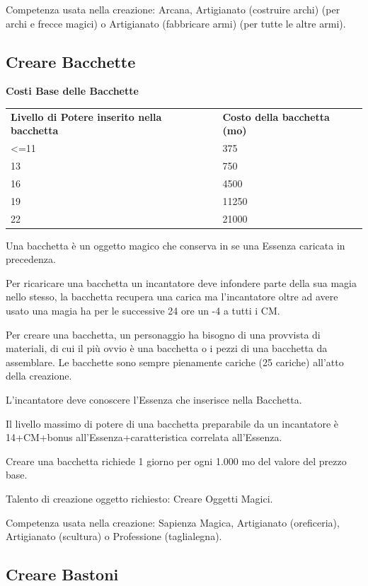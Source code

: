 \documentclass[a4paper,11pt,twoside,openany]{book}
\begin{document}
Competenza usata nella creazione: Arcana, Artigianato (costruire archi) (per archi e frecce magici) o Artigianato (fabbricare armi) (per tutte le altre armi).

\subsection{Creare Bacchette}

\bigskip

\textbf{Costi Base delle Bacchette}

\begin{tabular}{ll}
	\toprule
	\textbf{Livello di Potere inserito nella bacchetta} & \textbf{Costo della bacchetta (mo)}\\
	\textless=11        & 375\\
	13  & 750\\
	16  & 4500\\
	19  & 11250\\
	22  & 21000\\
\end{tabular}

\bigskip

Una bacchetta è un oggetto magico che conserva in se una Essenza caricata in precedenza.

Per ricaricare una bacchetta un incantatore deve infondere parte della sua magia nello stesso, la bacchetta recupera una carica ma l'incantatore oltre ad avere usato una magia ha per le successive 24 ore un -4 a tutti i CM.

Per creare una bacchetta, un personaggio ha bisogno di una provvista di materiali, di cui il più ovvio è una bacchetta o i pezzi di una bacchetta da assemblare. Le bacchette sono sempre pienamente cariche (25 cariche) all'atto della creazione.

L'incantatore deve conoscere l'Essenza che inserisce nella Bacchetta.

Il livello massimo di potere di una bacchetta preparabile da un incantatore è 14+CM+bonus all'Essenza+caratteristica correlata all'Essenza.

Creare una bacchetta richiede 1 giorno per ogni 1.000 mo del valore del prezzo base.

Talento di creazione oggetto richiesto: Creare Oggetti Magici.

Competenza usata nella creazione: Sapienza Magica, Artigianato (oreficeria),
Artigianato (scultura) o Professione (taglialegna).

\subsection{Creare Bastoni}
\end{document}
